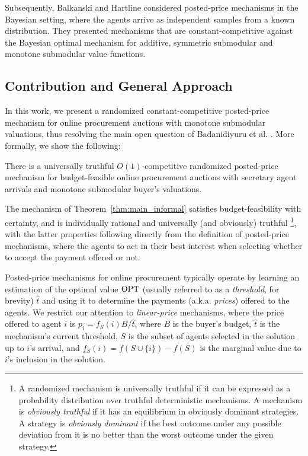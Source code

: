 Subsequently, Balkanski and Hartline \cite{BalkHart16} considered posted-price mechanisms in the Bayesian setting, where the agents arrive as independent samples from a known distribution. They presented mechanisms that are constant-competitive against the Bayesian optimal mechanism for additive, symmetric submodular and monotone submodular value functions. 

\subsection{Contribution and General Approach}
\label{sec:approach}

In this work, we present a randomized constant-competitive posted-price mechanism for online procurement auctions with monotone submodular valuations, thus resolving the main open question of Badanidiyuru et al. \cite{Bada2012}. More formally, we show the following:

\begin{theorem}\label{thm:main_informal}
There is a universally truthful $O(1)$-competitive randomized posted-price mechanism for budget-feasible online procurement auctions with secretary agent arrivals and  monotone submodular buyer's valuations.
\end{theorem}

The mechanism of Theorem~\ref{thm:main_informal} satisfies budget-feasibility with certainty, and is individually rational and universally (and obviously) truthful%
%
\footnote{A randomized mechanism is universally truthful if it can be expressed as a probability distribution over truthful deterministic mechanisms. A mechanism is \emph{obviously truthful} \cite{Li2017} if it has an equilibrium in obviously dominant strategies. A strategy is \emph{obviously dominant} if the best outcome under any possible deviation from it is no better than the worst outcome under the given strategy.}, 
%
with the latter properties following directly from the definition of posted-price mechanisms, where the agents to act in their best interest when selecting whether to accept the payment offered or not. 

Posted-price mechanisms for online procurement typically operate by learning an estimation of the optimal value $\mathrm{OPT}$ (usually referred to as a \emph{threshold}, for brevity) $\hat{t}$ and using it to determine the payments (a.k.a. \emph{prices}) offered to the agents. We restrict our attention to \emph{linear-price} mechanisms, where the price offered to agent $i$ is $p_i = f_S(i) B / \hat{t}$, where $B$ is the buyer's budget, $\hat{t}$ is the mechanism's current threshold, $S$ is the subset of agents selected in the solution up to $i$'s arrival, and $f_S(i) = f(S \cup \{ i \}) - f(S)$ is the marginal value due to $i$'s inclusion in the solution.

